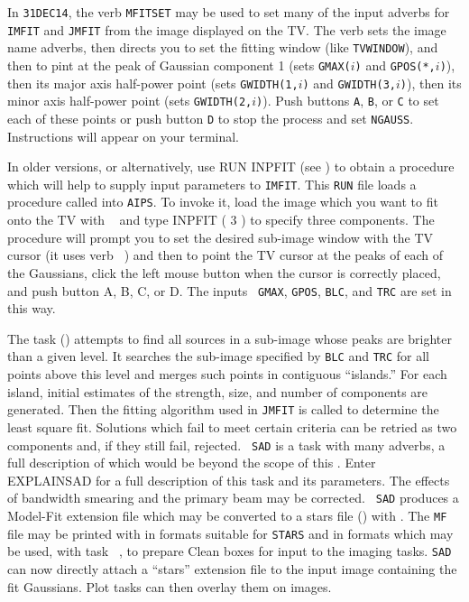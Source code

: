      In {\tt 31DEC14}, the verb {\tt MFITSET} may be used to set many
of the input adverbs for {\tt IMFIT} and {\tt JMFIT} from the image
displayed on the TV.  The verb sets the image name adverbs, then
directs you to set the fitting window (like {\tt TVWINDOW}), and then
to pint at the peak of Gaussian component 1 (sets {\tt GMAX($i$)} and
{\tt GPOS(*,$i$)}), then its major axis half-power point (sets
{\tt GWIDTH(1,$i$)} and {\tt GWIDTH(3,$i$)}), then its minor axis
half-power point (sets {\tt GWIDTH(2,$i$)}).  Push buttons {\tt A},
{\tt B}, or {\tt C} to set each of these points or push button {\tt D}
to stop the process and set {\tt NGAUSS}\@.  Instructions will appear
on your terminal.

     In older versions, or alternatively, use {\us RUN INPFIT \CR}
(see ) to obtain a procedure which will help to supply
input parameters to {\tt IMFIT}\@.  This {\tt RUN} file loads a
procedure called {\tt {}} into \hbox{{\tt AIPS}}. To invoke
it, load the image which you want to fit onto the TV with {\tt
{}} and type {\us INPFIT ( 3 ) \CR} to specify three
components.  The procedure will prompt you to set the desired
sub-image window with the TV cursor (it uses verb {\tt
{}}) and then to point the TV cursor at the peaks of each
of the Gaussians, click the left mouse button when the cursor is
correctly placed, and push button A, B, C, or D\@.  The inputs {\tt
GMAX}, {\tt GPOS}, {\tt BLC}, and {\tt TRC} are set in this way.


The task {\tt {}} () attempts to find all sources
in a sub-image whose peaks are brighter than a given level.  It
searches the sub-image specified by {\tt BLC} and {\tt TRC} for all
points above this level and merges such points in contiguous
``islands.''  For each island, initial estimates of the strength,
size, and number of components are generated.  Then the fitting
algorithm used in {\tt JMFIT} is called to determine the least square
 fit. Solutions which fail to meet certain criteria can
be retried as two components and, if they still fail, rejected.  {\tt
SAD} is a task with many adverbs, a full description of which would be
beyond the scope of this \Cookbook.  Enter {\us EXPLAIN\qs SAD \CR}
for a full description of this task and its parameters.  The effects
of bandwidth smearing and the primary beam may be corrected.  {\tt
SAD} produces a Model-Fit extension file which may be converted to a
stars file () with {\tt {}}\@.  The {\tt MF}
file may be printed with {\tt {}} in formats suitable for
{\tt STARS} and in formats which may be used, with task {\tt
{}}, to prepare Clean boxes for input to the imaging
tasks.  {\tt SAD} can now directly attach a ``stars'' extension file
to the input image containing the fit Gaussians.  Plot tasks can then
overlay them on images.


